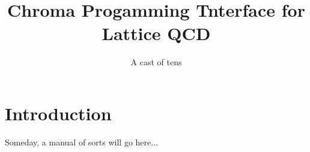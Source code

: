 \documentclass[12pt,letterpaper]{article}
\begin{document}
\title{
   Chroma Progamming Tnterface for Lattice QCD
}
\author{A cast of tens}

\maketitle
\section{Introduction}

Someday, a manual of sorts will go here...
\end{document}
